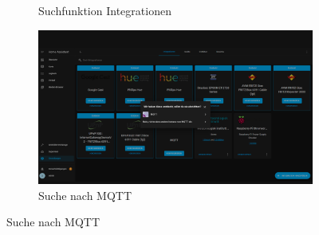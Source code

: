 \begin{figure}[H]
\begin{subfigure}{.5\linewidth}
        \caption{Suchfunktion Integrationen }
        \label{fig:ha12}
    \end{subfigure}
    \begin{subfigure}{.5\linewidth}
        \includegraphics[width=1\textwidth]{img/HA14.png}
        \caption{Suche nach MQTT }
        \label{fig:ha13}
    \end{subfigure}
\end{figure}

